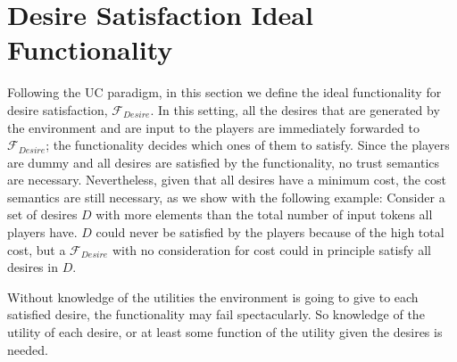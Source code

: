 \section{Desire Satisfaction Ideal Functionality}
  Following the UC paradigm, in this section we define the ideal functionality for desire satisfaction, $\mathcal{F}_{Desire}$.
  In this setting, all the desires that are generated by the environment and are input to the players are immediately forwarded
  to $\mathcal{F}_{Desire}$; the functionality decides which ones of them to satisfy. Since the players are dummy and all
  desires are satisfied by the functionality, no trust semantics are necessary. Nevertheless, given that all desires have a
  minimum cost, the cost semantics are still necessary, as we show with the following example: Consider a set of desires $D$
  with more elements than the total number of input tokens all players have. $D$ could never be satisfied by the players
  because of the high total cost, but a $\mathcal{F}_{Desire}$ with no consideration for cost could in principle satisfy all
  desires in $D$. 

  Without knowledge of the utilities the environment is going to give to each satisfied desire, the functionality may fail
  spectacularly. So knowledge of the utility of each desire, or at least some function of the utility given the desires is
  needed.
